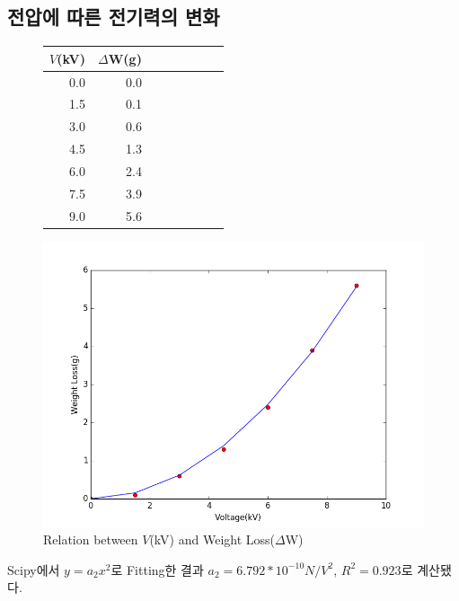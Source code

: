 \documentclass[a4paper, 8pt]{article}
\begin{document}
	\subsection{전압에 따른 전기력의 변화}
	\vspace{-6.5mm}
	\begin{figure}[h]
		\centering
		\begin{minipage}{.27\textwidth}
			\centering
			\begin{tabular}{rrrrrrrr}
			\hline \hline
			$V$(\si{kV}) & $\Delta${}W(\si{g}) \\
			\hline
			0.0 & 0.0 \\
			\hline
			1.5 & 0.1 \\
			\hline
			3.0 & 0.6 \\
			\hline
			4.5 & 1.3 \\
			\hline
			6.0 & 2.4 \\
			\hline
			7.5 & 3.9 \\
			\hline
			9.0 & 5.6 \\
			\hline \hline
			\end{tabular}
		\end{minipage}
		\hspace{0.1cm}
		\begin{minipage}{.7\textwidth}
			\includegraphics[width=\textwidth]{img/figure_2.png}
		\end{minipage}
		\caption{Relation between $V$(\si{kV}) and Weight Loss($\Delta$W)}
	\end{figure}
	Scipy에서 $y=a_{2}x^2$로 Fitting한 결과 $a_{2}=6.792*10^{-10}\si{N/V^{2}}$, $R^2=0.923$로 계산됐다.
\end{document}
